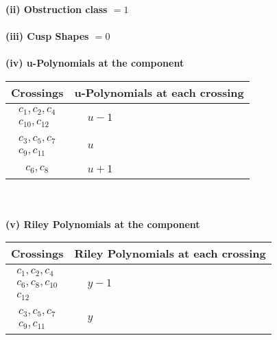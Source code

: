 \documentclass[1p]{elsarticle_modified}
\theoremstyle{definition}
\begin{document}
\flushleft \textbf{(ii) Obstruction class $= 1$}\\~\\
\flushleft \textbf{(iii) Cusp Shapes $= 0$}\\~\\
\newpage\renewcommand{\arraystretch}{1}
\flushleft \textbf{(iv) u-Polynomials at the component}\newline \\
\begin{tabular}{m{50pt}|m{274pt}}
Crossings & \hspace{64pt}u-Polynomials at each crossing \\
\hline $$\begin{aligned}c_{1},c_{2},c_{4}\\c_{10},c_{12}\end{aligned}$$&$\begin{aligned}
&u-1
\end{aligned}$\\
\hline $$\begin{aligned}c_{3},c_{5},c_{7}\\c_{9},c_{11}\end{aligned}$$&$\begin{aligned}
&u
\end{aligned}$\\
\hline $$\begin{aligned}c_{6},c_{8}\end{aligned}$$&$\begin{aligned}
&u+1
\end{aligned}$\\
\hline
\end{tabular}\\~\\
\newpage\renewcommand{\arraystretch}{1}
\flushleft \textbf{(v) Riley Polynomials at the component}\newline \\
\begin{tabular}{m{50pt}|m{274pt}}
Crossings & \hspace{64pt}Riley Polynomials at each crossing \\
\hline $$\begin{aligned}c_{1},c_{2},c_{4}\\c_{6},c_{8},c_{10}\\c_{12}\end{aligned}$$&$\begin{aligned}
&y-1
\end{aligned}$\\
\hline $$\begin{aligned}c_{3},c_{5},c_{7}\\c_{9},c_{11}\end{aligned}$$&$\begin{aligned}
&y
\end{aligned}$\\
\hline
\end{tabular}\\~\\
\end{document}
